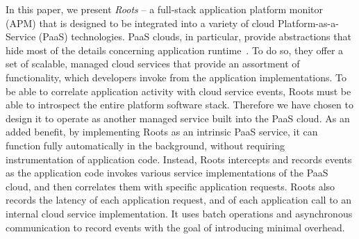 In this paper, we present \textit{Roots} --  
a full-stack application platform 
monitor (APM) that is designed to be integrated
into a variety of cloud Platform-as-a-Service (PaaS) technologies. 
PaaS clouds, in particular, provide abstractions that hide most of the 
details concerning application
runtime~\cite{Soni:2014:CCB:2592737.2592741}. 
To do so, they offer a set of scalable, managed cloud services that
provide an assortment of functionality,
which developers invoke from the application implementations.
To be able to correlate application activity with cloud service events,
Roots must be able to introspect the entire platform software stack. Therefore we
have chosen to design it to operate
as another managed service built into the PaaS cloud. 
As an added benefit, by implementing Roots as an intrinsic PaaS service,
it can function fully automatically in the background, without
requiring instrumentation of application code. Instead,
Roots intercepts and records events as the
application code invokes various service implementations of the PaaS cloud,
and then correlates them with specific application requests.
Roots also records the latency of each application request, and
of each application call to an
internal cloud service implementation. It uses batch operations and asynchronous 
communication to record events with the goal of introducing minimal overhead.


